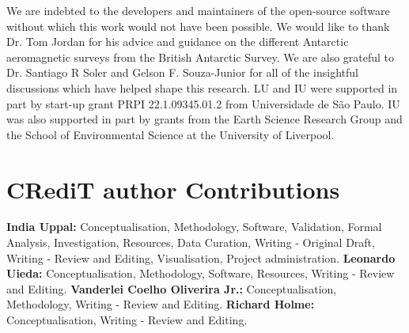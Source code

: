 We are indebted to the developers and maintainers of the open-source software without which this work would not have been possible. We would like to thank Dr. Tom Jordan for his advice and guidance on the different Antarctic aeromagnetic surveys from the British Antarctic Survey. We are also grateful to Dr. Santiago R Soler and Gelson F. Souza-Junior for all of the insightful discussions which have helped shape this research. LU and IU were supported in part by start-up grant PRPI 22.1.09345.01.2 from Universidade de São Paulo. IU was also supported in part by grants from the Earth Science Research Group and the School of Environmental Science at the University of Liverpool.

\section{CRediT author Contributions}

\textbf{India Uppal:} Conceptualisation, Methodology, Software, Validation, Formal Analysis, Investigation, Resources, Data Curation, Writing - Original Draft, Writing - Review and Editing, Visualisation, Project administration.
\textbf{Leonardo Uieda:} Conceptualisation, Methodology, Software, Resources, Writing - Review and Editing.
\textbf{Vanderlei Coelho Oliverira Jr.:} Conceptualisation, Methodology, Writing - Review and Editing.
\textbf{Richard Holme:} Conceptualisation, Writing - Review and Editing.
